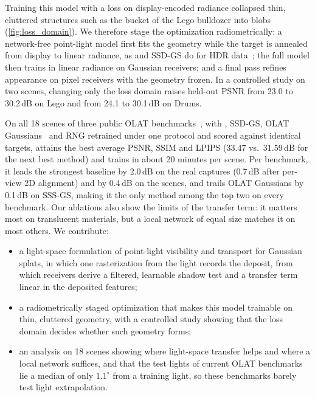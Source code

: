 Training this model with a loss on display-encoded radiance collapsed thin, cluttered structures such as the bucket of the Lego bulldozer into blobs (\cref{fig:loss_domain}).
We therefore stage the optimization radiometrically: a network-free point-light model first fits the geometry while the target is annealed from display to linear radiance, as \gsthree and SSD-GS do for HDR data~\cite{bi2024gs3,zheng2026ssdgs}; the full model then trains in linear radiance on Gaussian receivers; and a final pass refines appearance on pixel receivers with the geometry frozen.
In a controlled study on two scenes, changing only the loss domain raises held-out PSNR from 23.0 to 30.2\,dB on Lego and from 24.1 to 30.1\,dB on Drums.

On all 18 scenes of three public OLAT benchmarks~\cite{zeng2023nrhints,bi2024gs3,dihlmann2024sss}, with \gsthree, SSD-GS, OLAT Gaussians~\cite{kuang2024olat} and RNG retrained under one protocol and scored against identical targets, \ours attains the best average PSNR, SSIM and LPIPS (33.47 vs.\ 31.59\,dB for the next best method) and trains in about 20 minutes per scene.
Per benchmark, it leads the strongest baseline by 2.0\,dB on the real captures (0.7\,dB after per-view 2D alignment) and by 0.4\,dB on the \gsthree scenes, and trails OLAT Gaussians by 0.1\,dB on SSS-GS, making it the only method among the top two on every benchmark.
Our ablations also show the limits of the transfer term: it matters most on translucent materials, but a local network of equal size matches it on most others.
We contribute:
\begin{itemize}
\item a light-space formulation of point-light visibility and transport for Gaussian splats, in which one rasterization from the light records the deposit, from which receivers derive a filtered, learnable shadow test and a transfer term linear in the deposited features;
\item a radiometrically staged optimization that makes this model trainable on thin, cluttered geometry, with a controlled study showing that the loss domain decides whether such geometry forms;
\item an analysis on 18 scenes showing where light-space transfer helps and where a local network suffices, and that the test lights of current OLAT benchmarks lie a median of only $1.1^\circ$ from a training light, so these benchmarks barely test light extrapolation.
\end{itemize}
